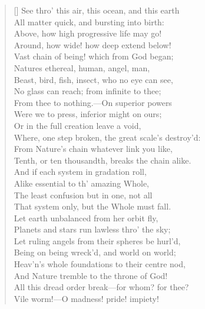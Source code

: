 \begin{verse}[\versewidth]
See thro' this air, this ocean, and this earth\\
All matter quick, and bursting into birth:\\
Above, how high progressive life may go!\\
Around, how wide! how deep extend below!\\
Vast chain of being! which from God began;\\
Natures ethereal, human, angel, man,\\
Beast, bird, fish, insect, who no eye can see,\\
No glass can reach; from infinite to thee;\\
From thee to nothing.---On superior powers\\
Were we to press, inferior might on ours;\\
Or in the full creation leave a void,\\
Where, one step broken, the great scale's destroy'd:\\
From Nature's chain whatever link you like,\\
Tenth, or ten thousandth, breaks the chain alike.\\
\vin And if each system in gradation roll,\\
Alike essential to th' amazing Whole,\\
The least confusion but in one, not all\\
That system only, but the Whole must fall.\\
Let earth unbalanced from her orbit fly,\\
Planets and stars run lawless thro' the sky;\\
Let ruling angels from their spheres be hurl'd,\\
Being on being wreck'd, and world on world;\\
Heav'n's whole foundations to their centre nod,\\
And Nature tremble to the throne of God!\\
All this dread order break---for whom? for thee?\\
Vile worm!---O madness! pride! impiety!


\end{verse}
